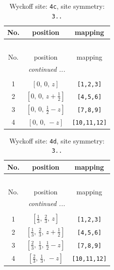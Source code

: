 \documentclass[fleqn,8pt]{jsarticle}
\begin{document}
\renewcommand{\arraystretch}{1.2}
\begin{longtable}{ccc}
\caption{Wyckoff site: {\tt 4c}, site symmetry: {\tt 3..}}
 \\
 \hline \hline
No. & position & mapping \\ \hline \endfirsthead

\multicolumn{2}{l}{\tablename\ \thetable{}} \\
 \hline \hline
No. & position & mapping \\ \hline \endhead

 \hline \hline
\multicolumn{2}{r}{\footnotesize\it continued ...} \\ \endfoot

 \hline \hline
\multicolumn{2}{r}{} \\ \endlastfoot

1 & $\left[ 0,\, 0,\, z \right]$ & {\tt [1,2,3]} \\ \hline
2 & $\left[ 0,\, 0,\, z + \frac{1}{2} \right]$ & {\tt [4,5,6]} \\ \hline
3 & $\left[ 0,\, 0,\, \frac{1}{2} - z \right]$ & {\tt [7,8,9]} \\ \hline
4 & $\left[ 0,\, 0,\, - z \right]$ & {\tt [10,11,12]} \\
\end{longtable}
\renewcommand{\arraystretch}{1.2}
\begin{longtable}{ccc}
\caption{Wyckoff site: {\tt 4d}, site symmetry: {\tt 3..}}
 \\
 \hline \hline
No. & position & mapping \\ \hline \endfirsthead

\multicolumn{2}{l}{\tablename\ \thetable{}} \\
 \hline \hline
No. & position & mapping \\ \hline \endhead

 \hline \hline
\multicolumn{2}{r}{\footnotesize\it continued ...} \\ \endfoot

 \hline \hline
\multicolumn{2}{r}{} \\ \endlastfoot

1 & $\left[ \frac{1}{3},\, \frac{2}{3},\, z \right]$ & {\tt [1,2,3]} \\ \hline
2 & $\left[ \frac{1}{3},\, \frac{2}{3},\, z + \frac{1}{2} \right]$ & {\tt [4,5,6]} \\ \hline
3 & $\left[ \frac{2}{3},\, \frac{1}{3},\, \frac{1}{2} - z \right]$ & {\tt [7,8,9]} \\ \hline
4 & $\left[ \frac{2}{3},\, \frac{1}{3},\, - z \right]$ & {\tt [10,11,12]} \\
\end{longtable}
\end{document}
